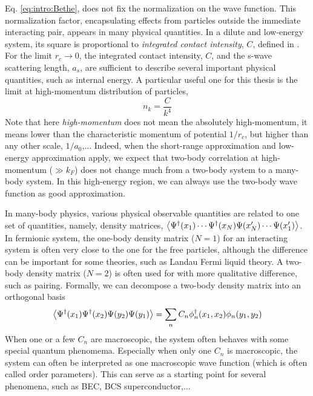   Eq. \ref{eq:intro:Bethe}, does not fix the normalization on the wave function. This normalization factor, encapsulating effects from particles outside the immediate interacting pair, appears in many physical quantities.  In a dilute and low-energy system,  its square is proportional to  \emph{integrated contact intensity}, $C$, defined in \cite{ Tan2008-1,Tan2008-2,CombescotTan}.  For the limit $r_c\to0$, the integrated contact intensity, $C$, and the s-wave scattering length, $a_s$, are sufficient to describe several important physical quantities, such as  internal energy.  A particular useful one for this thesis is the limit at high-momentum distribution of particles, 
 \begin{equation}
 n_k=\frac{C}{k^4}
 \end{equation}
 Note that here \emph{high-momentum} does not mean the absolutely high-momentum, it means lower than the characteristic momentum of potential $1/r_c$, but higher than any other scale, $1/a_0$,...  
 Indeed, when the short-range approximation and low-energy approximation apply, we expect that two-body correlation at  high-momentum ($\gg{k_{F}}$) does not change much from a two-body system to a many-body system.  In this high-energy region, we can always use   the two-body wave function as good approximation. 
 
 In many-body physics, various physical observable quantities are related to one set of  quantities, namely, density matrices,  $\bigl<{\Psi^{\dagger}(x_{1})\cdots\Psi^{\dagger}(x_{N})\Psi(x'_{N})\cdots\Psi(x'_{1})}\bigr>$. In fermionic system,  the one-body density matrix ($N=1$) for an interacting system is often very close to the one for the free particles, although the difference can be important for some theories, such as Landau Fermi liquid theory.  A two-body density matrix ($N=2$) is often  used for  with  more qualitative difference, such as pairing. Formally, we can decompose a two-body density matrix into an orthogonal basis
 \begin{equation}\label{eq:intro:2bodyDM}
 \bigl<{\Psi^{\dagger}(x_1)\Psi^{\dagger}(x_2)\Psi(y_2)\Psi(y_1)}\bigr>=\sum_nC_n\phi_n^{\dagger}(x_1,x_2)\phi_n(y_1,y_2)
 \end{equation}     
 When one or a few $C_n$ are macroscopic, the system often behaves with some special quantum phenomema.  Especially when only one $C_{n}$ is macroscopic, the system can often be interpreted as one macroscopic wave function (which is often called  order parameters).\cite{Leggett}  This can serve as a starting point for several phenomena, such as BEC, BCS superconductor,...
 
